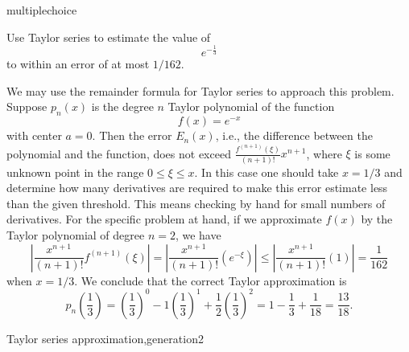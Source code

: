 \documentclass{ximera}
\begin{document}
\begin{question}[TAp1]
\begin{type}
multiplechoice
\end{type}
Use Taylor series to estimate the value of
\[e^{-\frac{1}{3}}\] to within an error of at most \(1/162\).
\begin{multiplechoice}
\end{multiplechoice}
\begin{feedback}
We may use the remainder formula for Taylor series to approach this problem.
Suppose \(p_n(x)\) is the degree \(n\) Taylor polynomial of the function
\[ f(x) = e^{-x}\]
with center \(a=0\). Then the error \(E_n(x)\), i.e., the difference between the polynomial and the function, does not exceed \(\frac{f^{(n+1)}(\xi)}{(n+1)!}x^{n+1}\), where \(\xi\) is some unknown point  in the range \(0 \leq \xi \leq x\). In this case one should take \(x = 1/3\) and determine how many derivatives are required to make this error estimate less than the given threshold. This means checking by hand for small numbers of derivatives. For the specific problem at hand, if we approximate \(f(x)\) by the Taylor polynomial of degree \( n = 2\), we have 
\[ \left| \frac{x^{n+1} }{(n+1)!} f^{(n+1)}(\xi) \right| = \left| \frac{x^{n+1}}{(n+1)!} \left( e^{-\xi} \right) \right| \leq \left| \frac{x^{n+1}}{(n+1)!} \left( 1 \right) \right| = \frac{1}{162} \] when \(x = 1/3\).
We conclude that the correct Taylor approximation is
\[ p_n \left( \frac{1}{3}\right) =  \left(\frac{1}{3}\right)^{0} -1\left(\frac{1}{3}\right)^{1} + \frac{1}{2}\left(\frac{1}{3}\right)^{2} =  1 -\frac{1}{3} + \frac{1}{18} = \frac{13}{18}.\]
\end{feedback}
\begin{keywords}
Taylor series approximation,generation2
\end{keywords}
\end{question}
\end{document}
